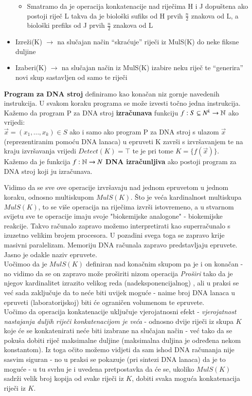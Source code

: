 \documentclass[a4paper,oneside,12pt]{memoir} %
\begin{document}
\begin{spacing}{1.5}
\begin{defn}
\begin{itemize}
\begin{itemize}
                \item Smatramo da je operacija konkatenacije nad riječima H i J dopuštena ako postoji riječ L takva da je biološki sufiks od H prvih $\frac{n}{2}$  znakova od L, a biološki prefiks od J prvih $\frac{n}{2}$ znakova od L
            \end{itemize}
    \item Izreži(K) $\to$ na slučajan način “skraćuje” riječi iz MulS(K) do neke fiksne duljine
    \item Izaberi(K) $\to$ na slučajan način iz MulS(K) izabire neku riječ te “generira” novi skup sastavljen od samo te riječi

    \end{itemize}
    \textbf{Program za DNA stroj} definiramo kao konačan niz gornje navedenih instrukcija. U svakom koraku programa se može izvesti točno jedna instrukcija.  Kažemo da program P za DNA stroj \textbf{izračunava} funkciju $f:S \subseteq N^k \to \mathbb{N}$ ako vrijedi:\\
$\vec{x}=(x_1,...,x_k) \in S$ ako i samo ako program P za DNA stroj s ulazom  $\vec{x}$ (reprezentiranim pomoću DNA lanaca) u epruveti K završi s izvršavanjem te na kraju izvršavanja vrijedi $Detect(K)=\top$ te je pri tome $K=\{f(\vec{x})\}$.\\
Kažemo da je funkcija $f:\mathbb{N} \to N$ \textbf{DNA izračunljiva} ako postoji program za DNA stroj koji ju izračunava.
\end{defn}
\begin{rem}
Vidimo da se sve ove operacije izvršavaju nad jednom epruvetom u jednom koraku, odnosno multiskupom $MulS(K)$. Što je veća kardinalnost multiskupa $MulS(K)$, to se više operacija na riječima izvrši istovremeno, a u stvarnom svijetu sve te operacije imaju svoje "biokemijske analogone" - biokemijske reakcije. Takvo računalo zapravo možemo interpretirati kao superračunalo s izuzetno velikim brojem procesora. U pozadini svega toga se zapravo krije masivni paralelizam. Memoriju DNA računala zapravo predstavljaju epruvete. Jasno je odakle naziv epruvete.\\
Uočimoo da je $MulS(K)$ definiran nad konačnim skupom pa je i on konačan - no vidimo da se on zapravo može proširiti nizom operacija \textit{Proširi} tako da je njegov kardinalitet izrazito velikog reda (nadeksponencijalnog) , ali u praksi se već sada zaključuje da to neće biti uvijek moguće - naime broj DNA lanaca u epruveti (laboratorijskoj) biti će ograničen volumenom te epruvete.\\
Uočimo da operacija konkatenacije uključuje vjerojatnosni efekt - \textit{vjerojatnost nastajanja duljih riječi konkatenacijom je veća} - odnosno dvije riječi iz skupa $K$ koje će se konkatenirati neće biti izabrane na slučajan način - već tako da se pokuša dobiti riječ maksimalne duljine (maksimalna duljina je određena nekom konstantom). Iz toga očito možemo vidjeti da sam ishod DNA računanja nije sasvim siguran  - no u praksi se pokazuje (pri sintezi DNA lanaca) da je to moguće - u tu svrhu je i uvedena pretpostavka da će  se, ukoliko $MulS(K)$ sadrži velik broj kopija od svake riječi iz $K$, dobiti svaka moguća konkatenacija riječi iz $K$.
\end{rem}

\end{spacing}
\end{document}

